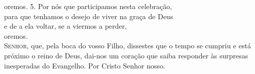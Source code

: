 \documentclass{book}
\begin{document}
oremos.
\vspace{.1cm}
\newline
{\color{VioletRed1} 5.} Por nós que participamos nesta celebração,\\
para que tenhamos o desejo de viver na graça de Deus\\
e de a ela voltar, se a viermos a perder,\\
oremos.
\vspace{.1cm} \\
\lettrine[findent=2pt]{\color{VioletRed1}S}{enhor}, que, pela boca do vosso Filho,
\newline
dissestes que o tempo se cumpriu
\newline
e está próximo o reino de Deus,
\newline
dai-nos um coração que saiba responder
\newline
às surpresas inesperadas do Evangelho.
\newline
Por Cristo Senhor nosso.
\newline
{}
\end{document}
